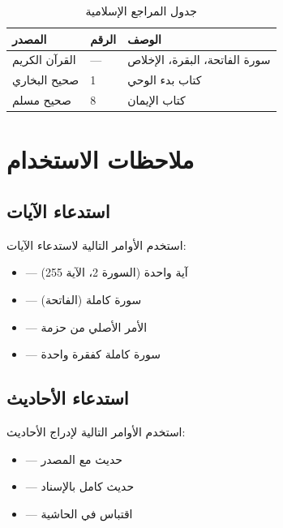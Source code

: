 \documentclass[12pt,a4paper]{article}
\begin{document}
\begin{table}[H]
\centering
\begin{tabularx}{\textwidth}{L{5cm} C{3cm} X}
\toprule
\textbf{المصدر} & \textbf{الرقم} & \textbf{الوصف} \\
\midrule
القرآن الكريم & --- & سورة الفاتحة، البقرة، الإخلاص \\
صحيح البخاري & 1 & كتاب بدء الوحي \\
صحيح مسلم & 8 & كتاب الإيمان \\
\bottomrule
\end{tabularx}
\caption{جدول المراجع الإسلامية}
\end{table}

\section{ملاحظات الاستخدام}

\subsection{استدعاء الآيات}

استخدم الأوامر التالية لاستدعاء الآيات:

\begin{itemize}[itemsep=0.3em]
  \item {} --- آية واحدة (السورة 2، الآية 255)
  \item {} --- سورة كاملة (الفاتحة)
  \item {} --- الأمر الأصلي من حزمة 
  \item {} --- سورة كاملة كفقرة واحدة
\end{itemize}

\subsection{استدعاء الأحاديث}

استخدم الأوامر التالية لإدراج الأحاديث:

\begin{itemize}[itemsep=0.3em]
  \item {} --- حديث مع المصدر
  \item {} --- حديث كامل بالإسناد
  \item {} --- اقتباس في الحاشية
\end{itemize}
\end{document}
